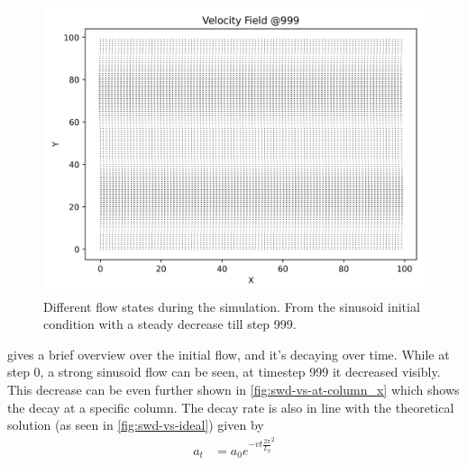 \begin{figure}[H]
\begin{minipage}{0.33\textwidth}
        \includegraphics[width=\linewidth]{graphs/ShearWaveDecay/VelocityDistribution/velocity_field_999}
    \end{minipage}
    \caption{
        Different flow states during the simulation.
        From the sinusoid initial condition with a steady decrease till step 999.
    }
    \label{fig:swd-vs-velocity-fields}
\end{figure}

 gives a brief overview over the initial flow, and it's decaying over time.
While at step 0, a strong sinusoid flow can be seen, at timestep 999 it decreased visibly.
This decrease can be even further shown in \cref{fig:swd-vs-at-column_x} which shows the decay at a specific column.
The decay rate is also in line with the theoretical solution (as seen in \cref{fig:swd-vs-ideal}) given by
\begin{equation*}
    \begin{aligned}
        a_t &= a_0 e^{-vt \frac{2\pi}{L_y}^2}
    \end{aligned}
\end{equation*}

